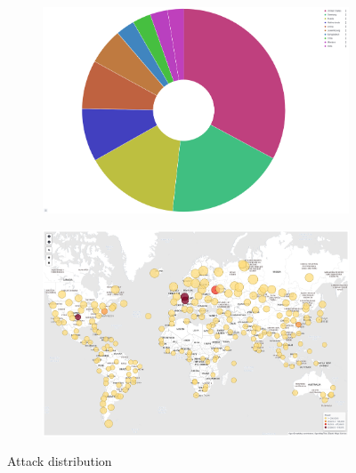 \begin{figure}
    \centering

    \begin{subfigure}[b]{0.49\textwidth}
        \centering
        \includegraphics[width=\textwidth]{figures/tpot-attacks-country.png}
        \caption{}
        \label{fig:tpot-overview-map}
    \end{subfigure}
    \hfill
    \begin{subfigure}[b]{0.49\textwidth}
        \centering
        \includegraphics[width=\textwidth]{figures/tpot-overview-map.png}
        \caption{}
        \label{fig:tpot-attack-country}
    \end{subfigure}
    \caption[Attack distribution]{Attack distribution}
    \label{fig:attack-distribution}
\end{figure}

